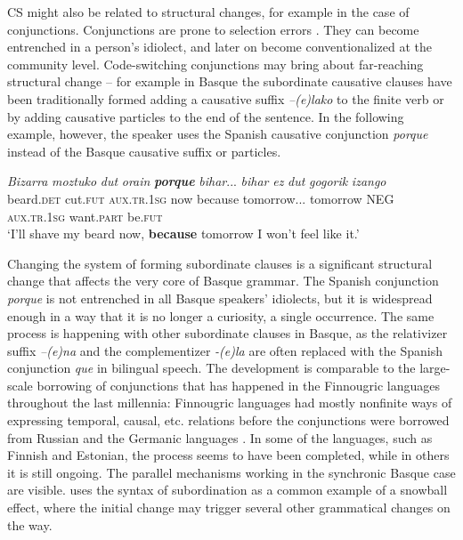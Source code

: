 \documentclass[output=paper,
modfonts
]{langscibook}
\begin{document}
CS might also be related to structural changes, for example in the case of conjunctions. Conjunctions are prone to selection errors \parencite{matras2009language}. They can become entrenched in a person’s idiolect, and later on become conventionalized at the community level. Code-switching conjunctions may bring about far-reaching structural change – for example in Basque the subordinate causative clauses have been traditionally formed adding a causative suffix \textit{–(e)lako} to the finite verb or by adding causative particles to the end of the sentence. In the following example, however, the speaker uses the Spanish causative conjunction \textit{porque} instead of the Basque causative suffix or particles.\\

\begin{exe}
\ex 
\gll \textit{Bizarra} \textit{moztuko} \textit{dut} \textit{orain} \textit{\textbf{porque}} \textit{bihar}... \textit{bihar} \textit{ez} \textit{dut} \textit{gogorik} \textit{izango}\\
beard.\textsc{det} cut.\textsc{fut} \textsc{aux.tr.1sg} now because tomorrow... tomorrow \textsc{NEG} \textsc{aux.tr.1sg} want.\textsc{part} be.\textsc{fut}\\
\trans `I’ll shave my beard now, \textbf{because} tomorrow I won’t feel like it.'
\
\end{exe}

Changing the system of forming subordinate clauses is a significant structural change that affects the very core of Basque grammar. The Spanish conjunction \textit{porque} is not entrenched in all Basque speakers' idiolects,  but it is widespread enough in a way that it is no longer a curiosity, a single occurrence. The same process is happening with other subordinate clauses in Basque, as the relativizer suffix \textit{–(e)na} and the complementizer \textit{-(e)la} are often replaced with the Spanish conjunction \textit{que} in bilingual speech. The development is comparable to the large-scale borrowing of conjunctions that has happened in the Finnougric languages throughout the last millennia: Finnougric languages had mostly nonfinite ways of expressing temporal, causal, etc. relations before the conjunctions were borrowed from Russian and the Germanic languages \parencite{hickey2010handbook}. In some of the languages, such as Finnish and Estonian, the process seems to have been completed, while in others it is still ongoing. The parallel mechanisms working in the synchronic Basque case are visible. \cite [pp. 62]{thomason2001contact} uses the syntax of subordination as a common example of a snowball effect, where the initial change may trigger several other grammatical changes on the way. 
\end{document}
